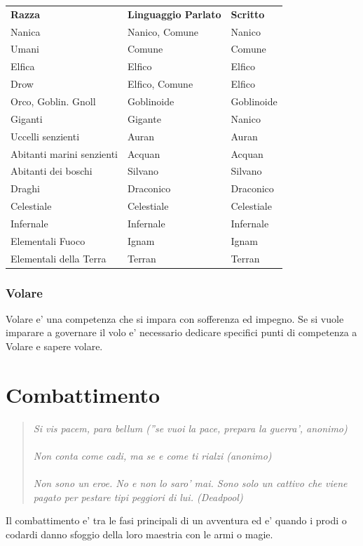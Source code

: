\documentclass[a4paper,11pt,twoside,openany]{book}
\begin{document}
\medskip

\begin{tabular}{lll}
\toprule
\textbf{Razza} & \textbf{Linguaggio Parlato}& \textbf{Scritto}\tabularnewline
Nanica & Nanico, Comune & Nanico\tabularnewline
Umani & Comune & Comune\tabularnewline
Elfica & Elfico & Elfico\tabularnewline
Drow & Elfico, Comune & Elfico\tabularnewline
Orco, Goblin. Gnoll & Goblinoide & Goblinoide\tabularnewline
Giganti & Gigante & Nanico\tabularnewline
Uccelli senzienti & Auran & Auran\tabularnewline
Abitanti marini senzienti & Acquan & Acquan\tabularnewline
Abitanti dei boschi & Silvano & Silvano\tabularnewline
Draghi & Draconico & Draconico\tabularnewline
Celestiale & Celestiale & Celestiale\tabularnewline
Infernale & Infernale & Infernale\tabularnewline
Elementali Fuoco & Ignam & Ignam\tabularnewline
Elementali della Terra & Terran & Terran\tabularnewline

\end{tabular}

\subsubsection{Volare}

\label{volare}

Volare e' una competenza che si impara con sofferenza ed impegno. Se si vuole imparare a governare il volo e' necessario dedicare specifici punti di competenza a Volare e sapere volare.

\pagebreak

\section{Combattimento}

\label{combattimento}
\begin{quote}\textit{
Si vis pacem, para bellum (''se vuoi la pace, prepara la guerra', anonimo)\\\\
Non conta come cadi, ma se e come ti rialzi (anonimo)\\\\
Non sono un eroe. No e non lo saro' mai. Sono solo un cattivo che viene pagato per pestare tipi peggiori di lui. (Deadpool)
}\end{quote}

Il combattimento e' tra le fasi principali di un avventura ed e' quando i prodi o codardi danno sfoggio della loro maestria con le armi o magie.
\end{document}
